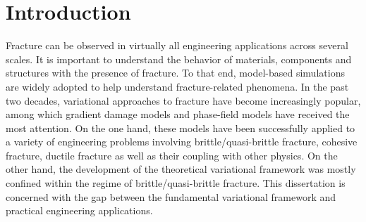\chapter{Introduction}
\label{section: Chapter1}

Fracture can be observed in virtually all engineering applications across several scales. It is important to understand the behavior of materials, components and structures with the presence of fracture. To that end, model-based simulations are widely adopted to help understand fracture-related phenomena. In the past two decades, variational approaches to fracture have become increasingly popular, among which gradient damage models and phase-field models have received the most attention. On the one hand, these models have been successfully applied to a variety of engineering problems involving brittle/quasi-brittle fracture, cohesive fracture, ductile fracture as well as their coupling with other physics. On the other hand, the development of the theoretical variational framework was mostly confined within the regime of brittle/quasi-brittle fracture. This dissertation is concerned with the gap between the fundamental variational framework and practical engineering applications.








